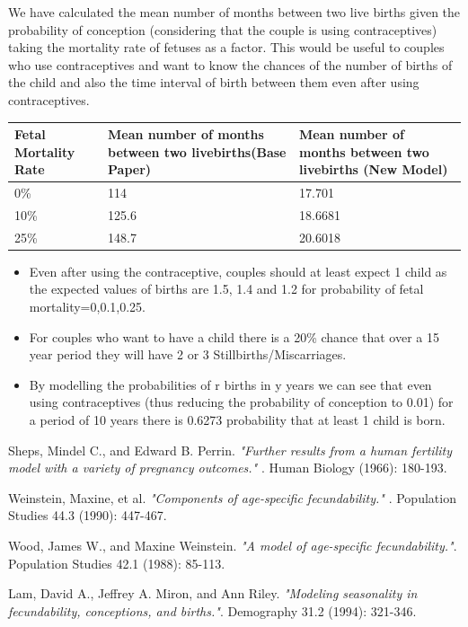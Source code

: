 \documentclass{article}
\begin{document}
We have calculated the mean number of months between two live births given the probability of conception (considering that the couple is using contraceptives) taking the mortality rate of fetuses as a factor. This would be useful to couples who use contraceptives and want to know the chances of the number of births of the child and also the time interval of birth between them even after using contraceptives.\\
	\begin{table}[H]
		\begin{center}
			\begin{tabular}{|m{2.4154cm}|m{6.4154cm}|m{6.4154cm}|}
				\hline
				Fetal Mortality Rate  & Mean number of months between two livebirths(Base Paper) & Mean number of months between two livebirths (New Model)\\ \hline
				0\% & 114    &17.701 \\ \hline
				10\% & 125.6 &18.6681 \\ \hline
				25\% & 148.7 &20.6018 \\ \hline
			\end{tabular}
		\end{center}
	\end{table}


\begin{itemize}
\item Even after using the contraceptive, couples should at least expect 1 child as the expected values of births are 1.5, 1.4 and 1.2 for probability of fetal mortality=0,0.1,0.25.
\item For couples who want to have a child there is a 20\% chance that over a 15 year period they will have 2 or 3 Stillbirths/Miscarriages.
\item By modelling the probabilities of r births in y years we can see that even using contraceptives (thus reducing the probability of conception to 0.01) for a period of 10 years there is 0.6273 probability that at least 1 child is born.
\end{itemize} 

\begin{thebibliography}{9}
	Sheps, Mindel C., and Edward B. Perrin.
	\textit{"Further results from a human fertility model with a variety of pregnancy outcomes." }. 
	Human Biology (1966): 180-193.
	
	
	Weinstein, Maxine, et al.
	\textit{"Components of age-specific fecundability." }. 
	Population Studies 44.3 (1990): 447-467.
	
	
	Wood, James W., and Maxine Weinstein.
	\textit{"A model of age-specific fecundability."}. 
	Population Studies 42.1 (1988): 85-113.
	
	Lam, David A., Jeffrey A. Miron, and Ann Riley.
	\textit{"Modeling seasonality in fecundability, conceptions, and births."}.
	Demography 31.2 (1994): 321-346.
	
	
\end{thebibliography}
\end{document}
